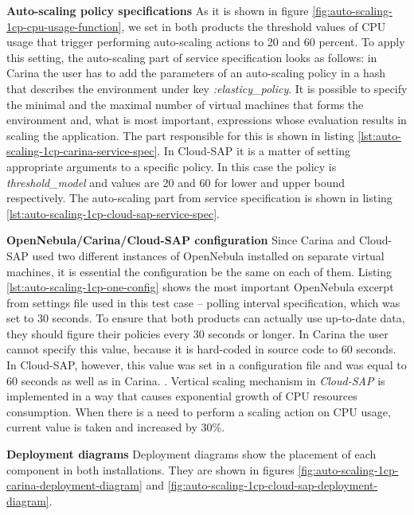 \begin{asparaenum}
  \item[\textbf{Auto-scaling policy specifications}] As it is shown in figure \ref{fig:auto-scaling-1cp-cpu-usage-function}, we set in both products the threshold values of CPU usage that trigger performing auto-scaling actions to 20 and 60 percent. To apply this setting, the auto-scaling part of service specification looks as follows: in Carina the user has to add the parameters of an auto-scaling policy in a hash that describes the environment under key \emph{:elasticy\_policy}. It is possible to specify the minimal and the maximal number of virtual machines that forms the environment and, what is most important, expressions whose evaluation results in scaling the application. The part responsible for this is shown in listing \ref{lst:auto-scaling-1cp-carina-service-spec}. In Cloud-SAP it is a matter of setting appropriate arguments to a specific policy. In this case the policy is \emph{threshold\_model} and values are 20 and 60 for lower and upper bound respectively. The auto-scaling part from service specification is shown in listing \ref{lst:auto-scaling-1cp-cloud-sap-service-spec}. 
  \item[\textbf{OpenNebula/Carina/Cloud-SAP configuration}] Since Carina and Cloud-SAP used two different instances of OpenNebula installed on separate virtual machines, it is essential the configuration be the same on each of them. Listing \ref{lst:auto-scaling-1cp-one-config} shows the most important OpenNebula excerpt from settings file used in this test case -- polling interval specification, which was set to 30 seconds. To ensure that both products can actually use up-to-date data, they should figure their policies every 30 seconds or longer. In Carina the user cannot specify this value, because it is hard-coded in source code to 60 seconds. In Cloud-SAP, however, this value was set in a configuration file and was equal to 60 seconds as well as in Carina. . Vertical scaling mechanism in \emph{Cloud-SAP} is implemented in a way that causes exponential growth of CPU resources consumption. When there is a need to perform a scaling action on CPU usage, current value is taken and increased by 30\%.
  \item[\textbf{Deployment diagrams}] Deployment diagrams show the placement of each component in both installations. They are shown in figures \ref{fig:auto-scaling-1cp-carina-deployment-diagram} and \ref{fig:auto-scaling-1cp-cloud-sap-deployment-diagram}.


\end{asparaenum}
